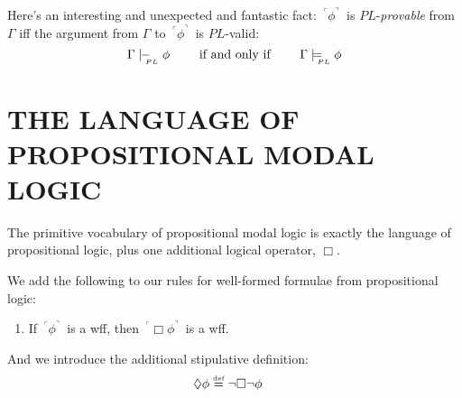 \documentclass[landscape, two column, full page,reqno]{article}
\newcommand{\qe}{\begin{enumerate}[align=left,style=nextline,leftmargin=17pt,labelsep=5pt,font=\normalfont]}
\newcommand{\ze}{\end{enumerate}}
\newcommand{\p}{\item}
\newcommand{\e}{\emph}
\newcommand{\fns}[1]{{\footnotesize #1}}
\newcommand{\qq}[1]{ ~\!^\ulcorner #1  ^\urcorner~\!}
\newcommand{\df}{\stackrel{\text{\tiny def}}{=}}
\newcommand{\plmodels}{\models_{\!\!\!\raisebox{-3pt}{\text{\tiny $PL$}}}}
\newcommand{\plproves}{\mid\hspace{-3.9pt}-_{\!\!\!\raisebox{-3pt}{\text{\tiny$PL$}}}\hspace{3pt}}
\newcommand{\D}{\Diamond}
\newcommand{\B}{\Box}
\begin{document}
\p Here's an interesting and unexpected and fantastic fact: $\qq{\phi}$ is $PL$-\e{provable} from $\Gamma$ iff the argument from $\Gamma$ to $\qq{\phi}$ is $PL$-valid:
		\[
		\Gamma \plproves \phi \qquad\text{ if and only if }\qquad \Gamma \plmodels \phi
		\]
		
\section{T\fns{HE} L\fns{ANGUAGE OF} P\fns{ROPOSITIONAL} M\fns{ODAL} L\fns{OGIC}}
\p The primitive vocabulary of propositional modal logic is exactly the language of propositional logic, plus one additional logical operator, $\B$.
\p We add the following to our rules for well-formed formulae from propositional logic:
	\qe
	\p If $\qq{\phi}$ is a wff, then  $\qq{\B \phi}$ is a wff.
	\ze 
\p And we introduce the additional stipulative definition:
			\begin{align*}
			\D \phi &\df \neg \B \neg \phi
			\end{align*}
\end{document}
